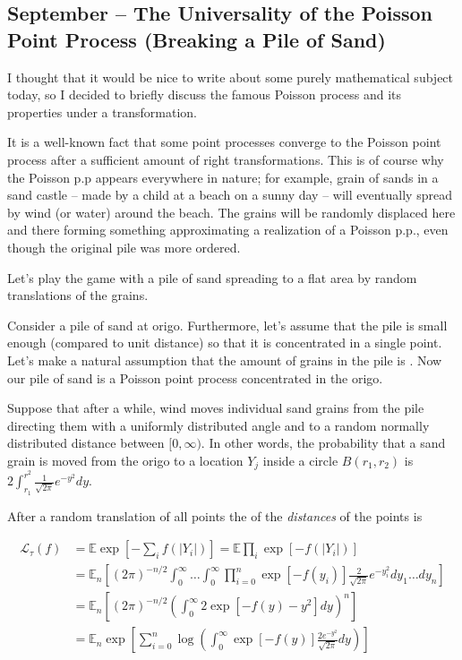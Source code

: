 \documentclass{article}
\begin{document}
  \subsection{September – The Universality of the Poisson Point Process (Breaking a Pile of Sand)}


  I thought that it would be nice to write about some purely mathematical subject today, so I decided to briefly discuss the famous Poisson process and its properties under a transformation.

  It is a well-known fact that some point processes converge to the Poisson point process after a sufficient amount of right transformations. This is of course why the Poisson p.p appears everywhere in nature; for example, grain of sands in a sand castle – made by a child at a beach on a sunny day – will eventually spread by wind (or water) around the beach. The grains will be randomly displaced here and there forming something approximating a realization of a Poisson p.p., even though the original pile was more ordered.

  Let's play the game with a pile of sand spreading to a flat area by random translations of the grains. 

  Consider a pile of sand at origo. Furthermore, let's assume that the pile is small enough (compared to unit distance) so that it is concentrated in a single point. Let's make a natural assumption that the amount of grains in the pile is  . Now our pile of sand is a Poisson point process concentrated in the origo.

  Suppose that after a while, wind moves individual sand grains from the pile directing them with a uniformly distributed angle and to a random normally distributed distance between $[0, \infty)$. In other words, the probability that a sand grain is moved from the origo to a location $Y_j$ inside a circle $B(r_1,r_2)$ is $2\int_{r_1}^{r^2} \frac{1}{\sqrt{2 \pi}}e^{-y^2} dy.$ 
  
  After a random translation of all points the  of the \textit{distances} of the points is 

  \begin{align*}
    \mathcal{L}_{\tau}(f) &= \mathbb{E} \exp \left[-\sum_i f(|Y_i|) \right] = \mathbb{E}  \prod_i \exp \left[  -f(|Y_i|)   \right]  \\
    &= \mathbb{E}_n \left[  (2 \pi)^{-n/2}  \int_0^{\infty} \dots \int_0^{\infty}  \prod_{i = 0}^n \exp \left[  -f(y_i)  \right] \frac{2}{\sqrt{2 \pi}}e^{-y_i^2} dy_1 \dots d y_n \right] \\
    &= \mathbb{E}_n \left[(2 \pi)^{-n/2}  \left( \int_{0}^{\infty}  2\exp \left[  -f(y) - y^2   \right] dy \right)^n\right] \\
    &= \mathbb{E}_n \exp \left[ \sum_{i= 0}^n \log \left(   \int_{0}^{\infty}  \exp \left[  -f(y)  \right] \frac{2e^{-y^2}}{\sqrt{2 \pi}} dy \right) \right] \\ 
  \end{align*}
\end{document}
